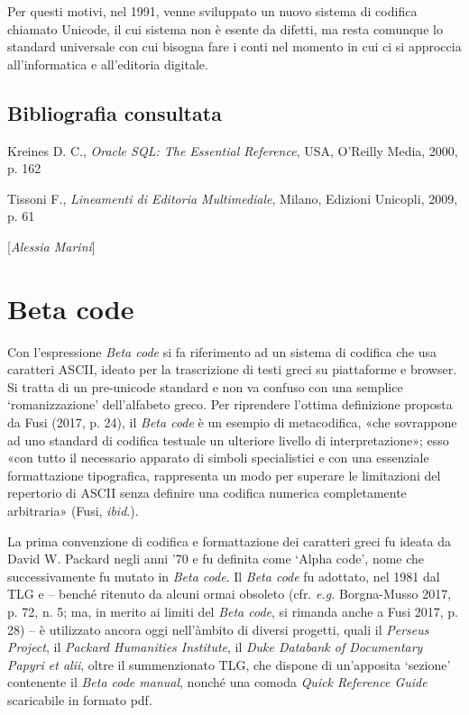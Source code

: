 Per questi motivi, nel 1991, venne sviluppato un nuovo sistema di
codifica chiamato Unicode, il cui sistema non è esente da difetti, ma
resta comunque lo standard universale con cui bisogna fare i conti nel
momento in cui ci si approccia all'informatica e all'editoria digitale.

\section*{Bibliografia consultata}
{\parindent0pt 
Kreines D. C., \emph{Oracle SQL: The Essential Reference}, USA, O'Reilly
Media, 2000, p. 162 

Tissoni F., \emph{Lineamenti di Editoria Multimediale}, Milano, Edizioni
Unicopli, 2009, p. 61 \par
}


\hrulefill 

{[}\emph{Alessia Marini}{]}



\chapter{Beta code}

Con l'espressione \emph{Beta code} si fa riferimento ad un sistema di
codifica che usa caratteri ASCII, ideato per la trascrizione di testi
greci su piattaforme e browser. Si tratta di un pre-unicode standard e
non va confuso con una semplice `romanizzazione' dell'alfabeto greco.
Per riprendere l'ottima definizione proposta da Fusi (2017, p. 24), il
\emph{Beta code} è un esempio di metacodifica, «che sovrappone ad uno
standard di codifica testuale un ulteriore livello di interpretazione»;
esso «con tutto il necessario apparato di simboli specialistici e con
una essenziale formattazione tipografica, rappresenta un modo per
superare le limitazioni del repertorio di ASCII senza definire una
codifica numerica completamente arbitraria» (Fusi, \emph{ibid}.).~

La prima convenzione di codifica e formattazione dei caratteri greci fu
ideata da David W. Packard negli anni '70 e fu definita come `Alpha
code', nome che successivamente fu mutato in \emph{Beta code}. Il
\emph{Beta code} fu adottato, nel 1981 dal TLG e -- benché ritenuto da
alcuni ormai obsoleto (cfr. \emph{e.g.} Borgna-Musso 2017, p. 72, n. 5;
ma, in merito ai limiti del \emph{Beta code}, si rimanda anche a Fusi
2017, p. 28) -- è utilizzato ancora oggi nell'àmbito di diversi
progetti, quali il \emph{Perseus Project}, il \emph{Packard Humanities
Institute}, il \emph{Duke Databank of Documentary Papyri et alii}, oltre
il summenzionato TLG, che dispone di un'apposita `sezione' contenente il
\emph{Beta code manual}, nonché una comoda \emph{Quick Reference Guide}
scaricabile in formato pdf.

